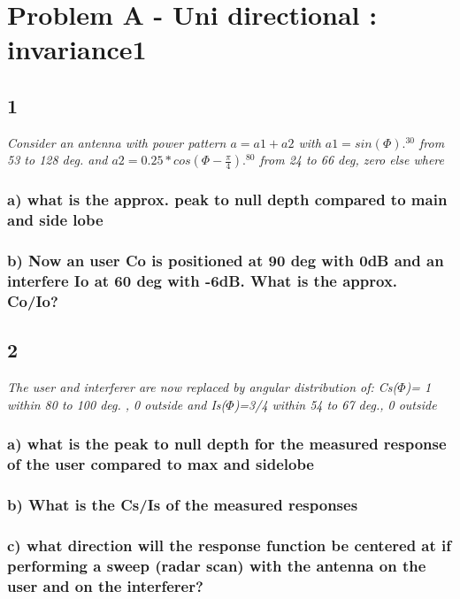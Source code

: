 \section{Problem A - Uni directional : invariance1} \label{sec:mm4_PbA}

\subsection{1}
\textit{Consider an antenna with power pattern $a=a1+a2$ with $a1=sin(\Phi).^30$ from 53 to 128 deg. and $a2=0.25*cos(\Phi - \frac{\pi}{4}).^80$ from 24 to 66 deg, zero else where}

\subsubsection{a) what is the approx. peak to null depth compared to main and side lobe}


\subsubsection{b) Now an user Co is positioned at 90 deg with 0dB and an interfere Io at 60 deg with -6dB. What is the approx. Co/Io?}


\subsection{2}
\textit{The user and interferer are now replaced by angular distribution of: Cs($\Phi$)= 1 within 80 to 100 deg. , 0 outside and Is($\Phi$)=3/4 within 54 to 67 deg., 0 outside}

\subsubsection{a) what is the peak to null depth for the measured response of the user compared to max and sidelobe}


\subsubsection{b) What is the Cs/Is of the measured responses}

\subsubsection{c) what direction will the response function be centered at if performing a sweep (radar scan) with the antenna on the user and on the interferer?}